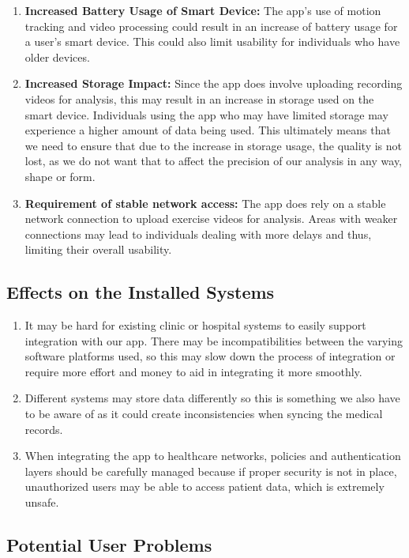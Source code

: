 \documentclass[12pt]{article}
\begin{document}
\begin{enumerate}
  \item \textbf{Increased Battery Usage of Smart Device:} The app’s use of motion tracking and video processing could result in an 
  increase of battery usage for a user’s smart device. This could also limit usability for individuals who have older devices. 
  \item \textbf{Increased Storage Impact:} Since the app does involve uploading recording videos for analysis, this may result in 
  an increase in storage used on the smart device. Individuals using the app who may have limited storage may experience a higher 
  amount of data being used. This ultimately means that we need to ensure that due to the increase in storage usage, the quality is 
  not lost, as we do not want that to affect the precision of our analysis in any way, shape or form.
  \item \textbf{Requirement of stable network access:} The app does rely on a stable network connection to upload exercise videos 
  for analysis. Areas with weaker connections may lead to individuals dealing with more delays and thus, limiting their overall 
  usability.
\end{enumerate}

\subsection{Effects on the Installed Systems}

\begin{enumerate}
  \item It may be hard for existing clinic or hospital systems to easily support integration with our app. There may be 
  incompatibilities between the varying software platforms used, so this may slow down the process of integration or require 
  more effort and money to aid in integrating it more smoothly.
  \item Different systems may store data differently so this is something we also have to be aware of as it could create 
  inconsistencies when syncing the medical records. 
  \item When integrating the app to healthcare networks, policies and authentication layers should be carefully managed 
  because if proper security is not in place, unauthorized users may be able to access patient data, which is extremely unsafe.
\end{enumerate}

\subsection{Potential User Problems}
\end{document}
